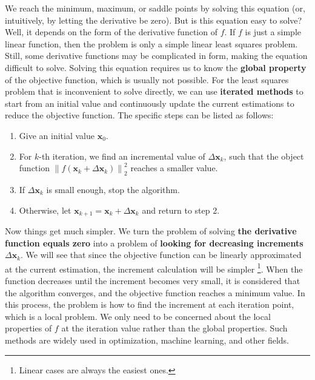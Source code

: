 We reach the minimum, maximum, or saddle points by solving this equation (or, intuitively, by letting the derivative be zero). But is this equation easy to solve? Well, it depends on the form of the derivative function of $f$. If $f$ is just a simple linear function, then the problem is only a simple linear least squares problem. Still, some derivative functions may be complicated in form, making the equation difficult to solve. Solving this equation requires us to know the \textbf{global property} of the objective function, which is usually not possible. For the least squares problem that is inconvenient to solve directly, we can use \textbf{iterated methods} to start from an initial value and continuously update the current estimations to reduce the objective function. The specific steps can be listed as follows:

\begin{mdframed}  
    \begin{enumerate}
        \item Give an initial value $\mathbf{x}_0$.
        \item For $k$-th iteration, we find an incremental value of $\Delta \mathbf{x}_k$, such that the object function $\left\| {f\left( \mathbf{x}_k + \Delta \mathbf{x}_k \right)} \right \|^2_2$ reaches a smaller value.
        \item If $\Delta \mathbf{x}_k$ is small enough, stop the algorithm.
        \item Otherwise, let $\mathbf{x}_{k+1} = \mathbf{x}_k+\Delta \mathbf{x}_k$ and return to step 2.
    \end{enumerate}
\end{mdframed}

Now things get much simpler. We turn the problem of solving \textbf{the derivative function equals zero} into a problem of \textbf{looking for decreasing increments} $\Delta \mathbf{x}_k$. We will see that since the objective function can be linearly approximated at the current estimation, the increment calculation will be simpler \footnote{Linear cases are always the easiest ones.}. When the function decreases until the increment becomes very small, it is considered that the algorithm converges, and the objective function reaches a minimum value. In this process, the problem is how to find the increment at each iteration point, which is a local problem. We only need to be concerned about the local properties of $f$ at the iteration value rather than the global properties. Such methods are widely used in optimization, machine learning, and other fields.

